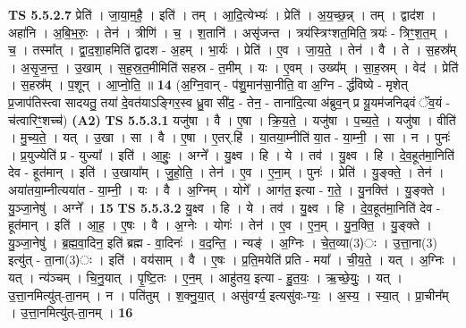 \documentclass[17pt]{extarticle}
\begin{document}
                  \newline
                                \textbf{ TS 5.5.2.7} \newline
                  प्रेति॑ । जा॒या॒म॒है॒ । इति॑ । तम् । आ॒दि॒त्येभ्यः॑ । प्रेति॑ । अ॒य॒च्छ॒न्न् । तम् । द्वाद॑श । अहा॑नि । अ॒बि॒भ॒रुः॒ । तेन॑ । त्रीणि॑ । च॒ । श॒तानि॑ । असृ॑जन्त । त्रय॑स्त्रिꣳशत॒मिति॒ त्रयः॑ - त्रिꣳ॒॒श॒त॒म् । च॒ । तस्मा᳚त् । द्वा॒द॒शा॒हमिति॑ द्वादश - अ॒हम् । भा॒र्यः॑ । प्रेति॑ । ए॒व । जा॒य॒ते॒ । तेन॑ । वै । ते । स॒हस्र᳚म् । अ॒सृ॒ज॒न्त॒ । उ॒खाम् । स॒ह॒स्र॒त॒मीमिति॑ सहस्र - त॒मीम् । यः । ए॒वम् । उख्य᳚म् । सा॒ह॒स्रम् । वेद॑ । प्रेति॑ । स॒हस्र᳚म् । प॒शून् । आ॒प्नो॒ति॒ ॥ \textbf{  14} \newline
                  \newline
                      (अ॒ग्नि॒वान् - प॑शु॒मान॑सा॒नीति॒ वा अ॒ग्नि - र्द्ध॑विष्ये - मृशेत् प्र॒जाप॑तिस्त्वा सादयतु॒ तया॑ दे॒वत॑याऽङ्गिर॒स्व ध्रु॒वा सी॑द॒ - तेन॒ - ताना॑दि॒त्या अ॑ब्रुव॒न् प्र यू॒यम॑जनिढ्वं ॅव॒यं - च॑त्वारिꣳ॒॒शच्च॑)  \textbf{(A2)} \newline \newline
                                \textbf{ TS 5.5.3.1} \newline
                  यजु॑षा । वै । ए॒षा । क्रि॒य॒ते॒ । यजु॑षा । प॒च्य॒ते॒ । यजु॑षा । वीति॑ । मु॒च्य॒ते॒ । यत् । उ॒खा । सा । वै । ए॒षा । ए॒तर्.हि॑ । या॒तया॒म्नीति॑ या॒त - या॒म्नी॒ । सा । न । पुनः॑ । प्र॒युज्येति॑ प्र - युज्या᳚ । इति॑ । आ॒हुः॒ । अग्ने᳚ । यु॒क्ष्व । हि । ये । तव॑ । यु॒क्ष्व । हि । दे॒व॒हूत॑मा॒निति॑ देव - हूत॑मान् । इति॑ । उ॒खाया᳚म् । जु॒हो॒ति॒ । तेन॑ । ए॒व । ए॒ना॒म् । पुनः॑ । प्रेति॑ । यु॒ङ्क्ते॒ । तेन॑ । अया॑तया॒म्नीत्यया॑त - या॒म्नी॒ । यः । वै । अ॒ग्निम् । योगे᳚ । आग॑त॒ इत्या - ग॒ते॒ । यु॒नक्ति॑ । यु॒ङ्क्ते । यु॒ञ्जा॒नेषु॑ । अग्ने᳚ । \textbf{  15} \newline
                  \newline
                                \textbf{ TS 5.5.3.2} \newline
                  यु॒क्ष्व । हि । ये । तव॑ । यु॒क्ष्व । हि । दे॒व॒हूत॑मा॒निति॑ देव - हूत॑मान् । इति॑ । आ॒ह॒ । ए॒षः । वै । अ॒ग्नेः । योगः॑ । तेन॑ । ए॒व । ए॒न॒म् । यु॒न॒क्ति॒ । यु॒ङ्क्ते । यु॒ञ्जा॒नेषु॑ । ब्र॒ह्म॒वा॒दिन॒ इति॑ ब्रह्म - वा॒दिनः॑ । व॒द॒न्ति॒ । न्यङ्॑ । अ॒ग्निः । चे॒त॒व्या(3)ः । उ॒त्ता॒ना(3) इत्यु॑त् - ता॒ना(3)ः । इति॑ । वय॑साम् । वै । ए॒षः । प्र॒ति॒मयेति॑ प्रति - मया᳚ । ची॒य॒ते॒ । यत् । अ॒ग्निः । यत् । न्य॑ञ्चम् । चि॒नु॒यात् । पृ॒ष्टि॒तः । ए॒न॒म् । आहु॑तय॒ इत्या - हु॒त॒यः॒ । ऋ॒च्छे॒युः॒ । यत् । उ॒त्ता॒नमित्यु॑त्-ता॒नम् । न । पति॑तुम् । श॒क्नु॒या॒त् । असु॑वर्ग्य॒ इत्यसु॑वः-ग्यः॒ । अ॒स्य॒ । स्या॒त् । प्रा॒चीन᳚म् । उ॒त्ता॒नमित्यु॑त्-ता॒नम् । \textbf{  16} \newline
\end{document}
